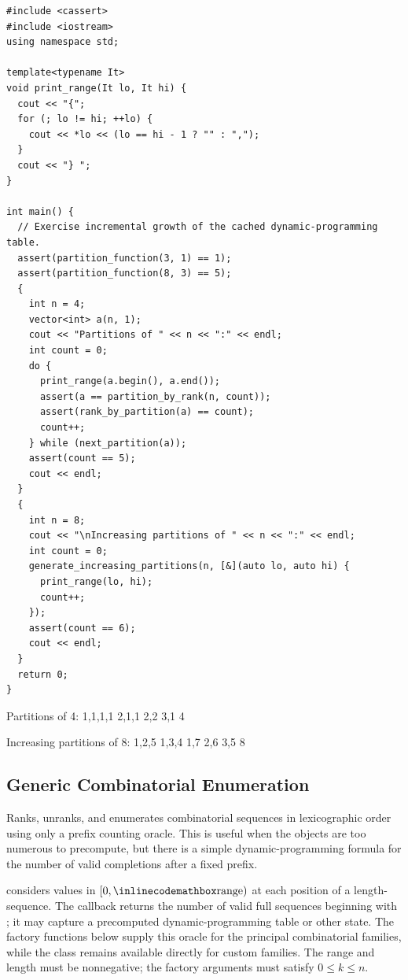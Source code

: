 \begin{lstlisting}[style=cpp]
#include <cassert>
#include <iostream>
using namespace std;

template<typename It>
void print_range(It lo, It hi) {
  cout << "{";
  for (; lo != hi; ++lo) {
    cout << *lo << (lo == hi - 1 ? "" : ",");
  }
  cout << "} ";
}

int main() {
  // Exercise incremental growth of the cached dynamic-programming table.
  assert(partition_function(3, 1) == 1);
  assert(partition_function(8, 3) == 5);
  {
    int n = 4;
    vector<int> a(n, 1);
    cout << "Partitions of " << n << ":" << endl;
    int count = 0;
    do {
      print_range(a.begin(), a.end());
      assert(a == partition_by_rank(n, count));
      assert(rank_by_partition(a) == count);
      count++;
    } while (next_partition(a));
    assert(count == 5);
    cout << endl;
  }
  {
    int n = 8;
    cout << "\nIncreasing partitions of " << n << ":" << endl;
    int count = 0;
    generate_increasing_partitions(n, [&](auto lo, auto hi) {
      print_range(lo, hi);
      count++;
    });
    assert(count == 6);
    cout << endl;
  }
  return 0;
}
\end{lstlisting}
\begin{exampleoutput}
Partitions of 4:
{1,1,1,1} {2,1,1} {2,2} {3,1} {4}

Increasing partitions of 8:
{1,2,5} {1,3,4} {1,7} {2,6} {3,5} {8}
\end{exampleoutput}
\subsection{Generic Combinatorial Enumeration}
\label{sec:6.2.6}
Ranks, unranks, and enumerates combinatorial sequences in lexicographic order using only a prefix counting oracle. This is useful when the objects are too numerous to precompute, but there is a simple dynamic-programming formula for the number of valid completions after a fixed prefix.

 considers values in $[0, {\inlinecodemath{range}})$ at each position of a length- sequence. The callback  returns the number of valid full sequences beginning with ; it may capture a precomputed dynamic-programming table or other state. The factory functions below supply this oracle for the principal combinatorial families, while the class remains available directly for custom families. The range and length must be nonnegative; the factory arguments must satisfy $0 \leq k \leq n$.

